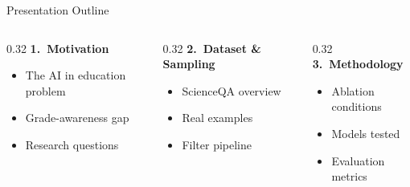 \documentclass[aspectratio=169]{beamer}
\begin{document}
\begin{frame}{Presentation Outline}
\begin{columns}[T,totalwidth=\textwidth]
  \begin{column}{0.32\textwidth}
    \textbf{\textcolor{custompurple}{1.~Motivation}}
    \begin{itemize}\itemsep2pt\small
      \item The AI in education problem
      \item Grade-awareness gap
      \item Research questions
    \end{itemize}
  \end{column}
  \begin{column}{0.32\textwidth}
    \textbf{\textcolor{custompurple}{2.~Dataset \& Sampling}}
    \begin{itemize}\itemsep2pt\small
      \item ScienceQA overview
      \item Real examples
      \item Filter pipeline
    \end{itemize}
  \end{column}
  \begin{column}{0.32\textwidth}
    \textbf{\textcolor{custompurple}{3.~Methodology}}
    \begin{itemize}\itemsep2pt\small
      \item Ablation conditions
      \item Models tested
      \item Evaluation metrics
    \end{itemize}
  \end{column}
\end{columns}

\vspace{0.4cm}


\end{frame}
\end{document}
